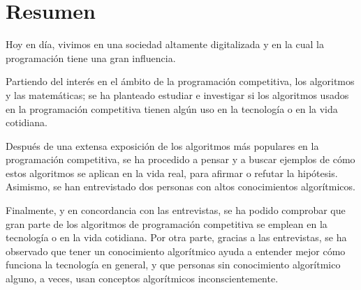 


\section{Resumen} 

Hoy en día, vivimos en una sociedad altamente digitalizada y en la cual la programación tiene una gran influencia. \newline

Partiendo del interés en el ámbito de la programación competitiva, los algoritmos y las matemáticas; se ha planteado estudiar e investigar si los algoritmos usados en la programación competitiva tienen algún uso en la tecnología o en la vida cotidiana. \newline

Después de una extensa exposición de los algoritmos más populares en la programación competitiva, se ha procedido a pensar y a buscar ejemplos de cómo estos algoritmos se aplican en la vida real, para afirmar o refutar la hipótesis. Asimismo, se han entrevistado dos personas con altos conocimientos algorítmicos. \newline

Finalmente, y en concordancia con las entrevistas, se ha podido comprobar que gran parte de los algoritmos de programación competitiva se emplean en la tecnología o en la vida cotidiana. Por otra parte, gracias a las entrevistas, se ha observado que tener un conocimiento algorítmico ayuda a entender mejor cómo funciona la tecnología en general, y que personas sin conocimiento algorítmico alguno, a veces, usan conceptos algorítmicos inconscientemente. \newline







